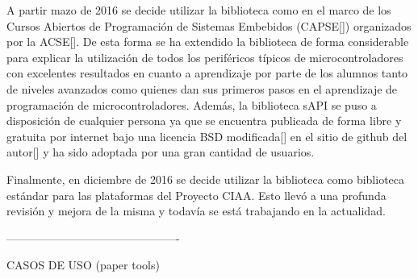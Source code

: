 A partir mazo de 2016 se decide utilizar la biblioteca como en el marco de los Cursos Abiertos de Programación de Sistemas Embebidos (CAPSE[]) organizados por la ACSE[]. De esta forma se ha extendido la biblioteca de forma considerable para explicar la utilización de todos los periféricos típicos de microcontroladores con excelentes resultados en cuanto a aprendizaje por parte de los alumnos tanto de niveles avanzados como quienes dan sus primeros pasos en el aprendizaje de programación de microcontroladores.
Además, la biblioteca sAPI se puso a disposición de cualquier persona ya que se encuentra publicada de forma libre y gratuita por internet bajo una licencia BSD modificada[] en el sitio de github del autor[] y ha sido adoptada por una gran cantidad de usuarios. 

Finalmente, en diciembre de 2016 se decide utilizar la biblioteca como biblioteca estándar para las plataformas del Proyecto CIAA. Esto llevó a una profunda revisión y mejora de la misma y todavía se está trabajando en la actualidad.


----------------------------------------------


CASOS DE USO (paper tools)

